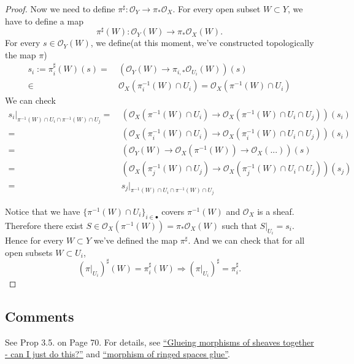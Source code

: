 \begin{proof}
    Now we need to define $\pi^{\sharp}:\mathscr O_Y\to \pi_{\ast}\mathscr O_X$. For every open subset $W\subset Y$, we have to define a map
    \[\pi^{\sharp}(W):\mathscr O_Y(W)\to \pi_{\ast}\mathscr O_X(W).\]
    For every $s\in \mathscr O_Y(W)$, we define(at this moment, we've constructed topologically the map $\pi$)
    \begin{align*}
        s_i:=\pi_i^{\sharp}(W)(s)=&~(\mathscr O_Y(W)\to \pi_{i,\ast}\mathscr O_{U_i}(W))(s)\\
        \in&~\mathscr O_X(\pi_i^{-1}(W)\cap U_i)=\mathscr O_X(\pi^{-1}(W)\cap U_i)
    \end{align*}
    We can check 
    \begin{align*}
        s_i\vert_{\pi^{-1}(W)\cap U_i\cap \pi^{-1}(W)\cap U_j}=&~ (\mathscr O_X(\pi^{-1}(W)\cap U_i)\to\mathscr O_X(\pi^{-1}(W)\cap U_i\cap U_j))(s_i)\\
        =&~ (\mathscr O_X(\pi_i^{-1}(W)\cap U_i)\to\mathscr O_X(\pi_i^{-1}(W)\cap U_i\cap U_j))(s_i)\\ 
        =&~ (\mathscr O_Y(W)\to \mathscr O_X(\pi^{-1}(W))\to \mathscr O_X(...))(s)\\
        =&~ (\mathscr O_X(\pi_j^{-1}(W)\cap U_j)\to\mathscr O_X(\pi_j^{-1}(W)\cap U_i\cap U_j))(s_j)\\  
        =&~ s_j\vert_{\pi^{-1}(W)\cap U_i\cap \pi^{-1}(W)\cap U_j}
    \end{align*}

    Notice that we have $\{\pi^{-1}(W)\cap U_i\}_{i\in\bullet}$ covers $\pi^{-1}(W)$ and $\mathscr O_X$ is a sheaf. Therefore there exist $S\in \mathscr O_X(\pi^{-1}(W))=\pi_{\ast}\mathscr O_X(W)$ such that $S\vert_{U_i}=s_i$. Hence for every $W\subset Y$ we've defined the map $\pi^{\sharp}$. And we can check that for all open subsets $W\subset U_i$, \[(\pi\vert_{U_i})^{\sharp}(W)=\pi_i^{\sharp}(W)\Rightarrow(\pi\vert_{U_i})^{\sharp}=\pi_i^{\sharp}.\]
\end{proof}

\subsection{Comments}
See Prop 3.5. \cite{gortz2020algebraic} on Page 70. For details, see \href{https://math.stackexchange.com/questions/442911/glueing-morphisms-of-sheaves-together-can-i-just-do-this}{\enquote{Glueing morphisms of sheaves together - can I just do this?}} and \href{https://math.stackexchange.com/questions/1173973/morphism-of-ringed-spaces-glue?noredirect=1&lq=1}{\enquote{morphism of ringed spaces glue}}.

